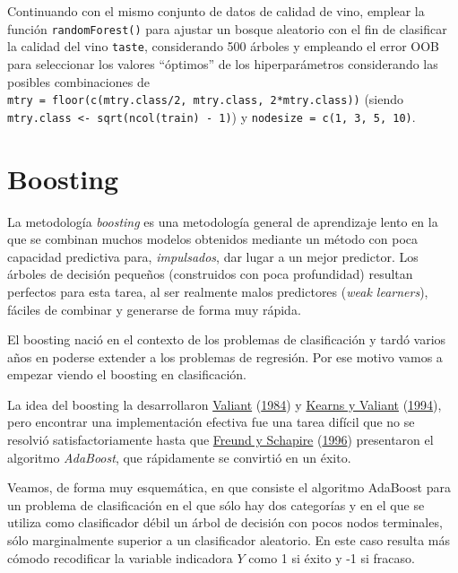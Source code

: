 \documentclass[
  spanish,
]{book}
\theoremstyle{break}
\theoremstyle{definition}
\theoremstyle{definition}
\theoremstyle{definition}
\theoremstyle{definition}
\theoremstyle{remark}
\begin{document}
Continuando con el mismo conjunto de datos de calidad de vino, emplear la función \texttt{randomForest()} para ajustar un bosque aleatorio con el fin de clasificar la calidad del vino \texttt{taste}, considerando 500 árboles y empleando el error OOB para seleccionar los valores ``óptimos'' de los hiperparámetros considerando las posibles combinaciones de \texttt{mtry\ =\ floor(c(mtry.class/2,\ mtry.class,\ 2*mtry.class))} (siendo \texttt{mtry.class\ \textless{}-\ sqrt(ncol(train)\ -\ 1)}) y \texttt{nodesize\ =\ c(1,\ 3,\ 5,\ 10)}.

\hypertarget{boosting}{%
\section{Boosting}\label{boosting}}

La metodología \emph{boosting} es una metodología general de aprendizaje lento en la que se combinan muchos modelos obtenidos mediante un método con poca capacidad predictiva para, \emph{impulsados}, dar lugar a un mejor predictor. Los árboles de decisión pequeños (construidos con poca profundidad) resultan perfectos para esta tarea, al ser realmente malos predictores (\emph{weak learners}), fáciles de combinar y generarse de forma muy rápida.

El boosting nació en el contexto de los problemas de clasificación y tardó varios años en poderse extender a los problemas de regresión. Por ese motivo vamos a empezar viendo el boosting en clasificación.

La idea del boosting la desarrollaron \protect\hyperlink{ref-valiant1984theory}{Valiant} (\protect\hyperlink{ref-valiant1984theory}{1984}) y \protect\hyperlink{ref-kearns_cryptographic_1994}{Kearns y Valiant} (\protect\hyperlink{ref-kearns_cryptographic_1994}{1994}), pero encontrar una implementación efectiva fue una tarea difícil que no se resolvió satisfactoriamente hasta que \protect\hyperlink{ref-freund1996schapire}{Freund y Schapire} (\protect\hyperlink{ref-freund1996schapire}{1996}) presentaron el algoritmo \emph{AdaBoost}, que rápidamente se convirtió en un éxito.

Veamos, de forma muy esquemática, en que consiste el algoritmo AdaBoost para un problema de clasificación en el que sólo hay dos categorías y en el que se utiliza como clasificador débil un árbol de decisión con pocos nodos terminales, sólo marginalmente superior a un clasificador aleatorio.
En este caso resulta más cómodo recodificar la variable indicadora \(Y\) como 1 si éxito y -1 si fracaso.
\end{document}
